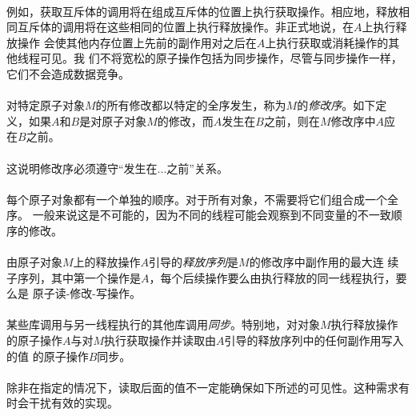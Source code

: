 \paragraph{}
\notes 例如，获取互斥体的调用将在组成互斥体的位置上执行获取操作。相应地，释放相
同互斥体的调用将在这些相同的位置上执行释放操作。非正式地说，在$A$上执行释放操作
会使其他内存位置上先前的副作用对之后在$A$上执行获取或消耗操作的其他线程可见。我
们不将宽松的原子操作包括为同步操作，尽管与同步操作一样，它们不会造成数据竞争。

\paragraph{}
对特定原子对象$M$的所有修改都以特定的全序发生，称为$M$的\textit{修改序}。如下定
义，如果$A$和$B$是对原子对象$M$的修改，而$A$发生在$B$之前，则在$M$修改序中$A$应
在$B$之前。

\paragraph{}
\notes 这说明修改序必须遵守``发生在...之前''关系。

\paragraph{}
\notes 每个原子对象都有一个单独的顺序。对于所有对象，不需要将它们组合成一个全序。
一般来说这是不可能的，因为不同的线程可能会观察到不同变量的不一致顺序的修改。

\paragraph{}
由原子对象$M$上的释放操作$A$引导的\textit{释放序列}是$M$的修改序中副作用的最大连
续子序列，其中第一个操作是$A$，每个后续操作要么由执行释放的同一线程执行，要么是
原子读-修改-写操作。

\paragraph{}
某些库调用与另一线程执行的其他库调用\textit{同步}。特别地，对对象$M$执行释放操作
的原子操作$A$与对$M$执行获取操作并读取由$A$引导的释放序列中的任何副作用写入的值
的原子操作$B$同步。

\paragraph{}
\notes 除非在指定的情况下，读取后面的值不一定能确保如下所述的可见性。这种需求有
时会干扰有效的实现。

